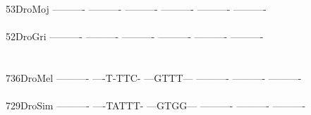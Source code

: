 \documentclass[11pt,twoside,reqno,a4paper]{article}
\begin{document}
{53\hspace*{3\charwidth}DroMoj	----------	----------	----------	----------	----------	----------	\\
\hspace*{5\charwidth}\hspace*{7\charwidth}\hspace*{1\charwidth}\hspace*{1\charwidth}\hspace*{1\charwidth}\hspace*{1\charwidth}\hspace*{1\charwidth}\hspace*{1\charwidth}\\
52\hspace*{3\charwidth}DroGri	----------	----------	----------	----------	----------	----------	\\
\hspace*{5\charwidth}\hspace*{7\charwidth}\hspace*{1\charwidth}\hspace*{1\charwidth}\hspace*{1\charwidth}\hspace*{1\charwidth}\hspace*{1\charwidth}\hspace*{1\charwidth}\\
\\
736\hspace*{2\charwidth}DroMel	----------	----T-TTC-	---GTTT---	----------	----------	----------	\\
\hspace*{5\charwidth}\hspace*{7\charwidth}\hspace*{1\charwidth}\hspace*{1\charwidth}\hspace*{1\charwidth}\hspace*{1\charwidth}\hspace*{1\charwidth}\hspace*{1\charwidth}\\
729\hspace*{2\charwidth}DroSim	----------	----TATTT-	---GTGG---	----------	----------	----------	\\
\hspace*{5\charwidth}\hspace*{7\charwidth}\hspace*{1\charwidth}\hspace*{1\charwidth}\hspace*{1\charwidth}\hspace*{1\charwidth}\hspace*{1\charwidth}\hspace*{1\charwidth}\\
}
\end{document}

